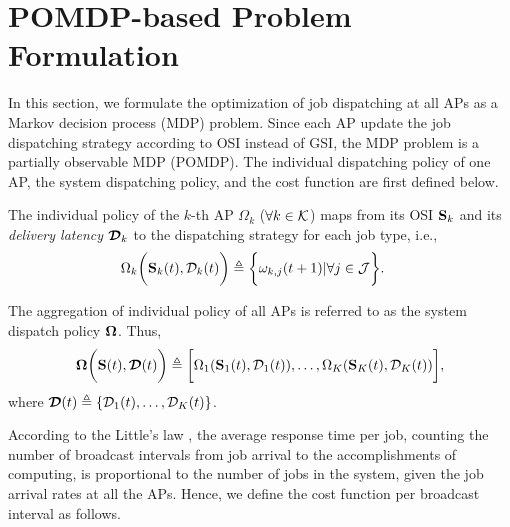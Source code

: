 \section{POMDP-based Problem Formulation}
\label{sec:formulation}
In this section, we formulate the optimization of job dispatching at all APs as a Markov decision process (MDP) problem.
Since each AP update the job dispatching strategy according to OSI instead of GSI, the MDP problem is a partially observable MDP (POMDP).
The individual dispatching policy of one AP, the system dispatching policy, and the cost function are first defined below.

\begin{definition}
    The individual policy of the $k$-th AP $\Omega_{k}$ ($\forall k \in\mathcal{K}$) maps from its OSI $\mathbf{S}_{k}$ and its \emph{delivery latency} $\boldsymbol{\mathcal{D}}_{k}$ to the dispatching strategy for each job type, i.e.,
    \begin{align}
        &\Omega_{k} \bigg( \mathbf{S}_{k}(t), \mathcal{D}_{k}(t) \bigg)
        \triangleq \bigg\{
            \omega_{k,j}(t+1)|\forall j\in\mathcal{J}
        \bigg\}.
        \label{def:action}
    \end{align}

    The aggregation of individual policy of all APs is referred to as the system dispatch policy $\boldsymbol{\Omega}$.
    Thus,
    {\small
    \begin{align}
        \boldsymbol{\Omega}\bigg( \mathbf{S}(t), \boldsymbol{\mathcal{D}}(t) \bigg) \triangleq \bigg[
            \Omega_{1}(\mathbf{S}_{1}(t), \mathcal{D}_{1}(t)), \dots, \Omega_{K}(\mathbf{S}_{K}(t),\mathcal{D}_{K}(t))
        \bigg],
    \end{align}
    }
    where $\boldsymbol{\mathcal{D}}(t) \triangleq \{ \mathcal{D}_{1}(t), \dots, \mathcal{D}_{K}(t) \}$.
\end{definition}

According to the Little's law \cite{Little1961}, the average response time per job, counting the number of broadcast intervals from job arrival to the accomplishments of computing, is proportional to the number of jobs in the system, given the job arrival rates at all the APs.
Hence, we define the cost function per broadcast interval as follows.

